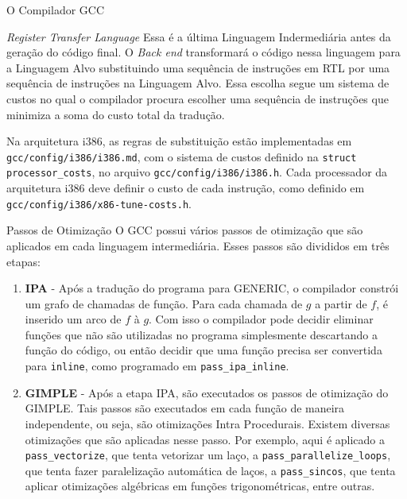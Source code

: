 \begin{section}{O Compilador GCC}
\begin{subsection}{\textit{Register Transfer Language}}
    Essa é a última Linguagem Indermediária antes da geração do código final. O
\textit{Back end} transformará o código nessa linguagem para a Linguagem Alvo
substituindo uma sequência de instruções em RTL por uma sequência de instruções
na Linguagem Alvo. Essa escolha segue um sistema
de custos no qual o compilador procura escolher uma sequência de instruções
que minimiza a soma do custo total da tradução.

    Na arquitetura i386, as regras de substituição estão implementadas
em \texttt{gcc/config/i386/i386.md}, com o sistema de custos definido
na \texttt{struct processor\_costs}, no arquivo \texttt{gcc/config/i386/i386.h}.
Cada processador da arquitetura i386 deve definir o custo de cada instrução,
como definido em \texttt{gcc/config/i386/x86-tune-costs.h}.


\end{subsection}

\begin{subsection}{Passos de Otimização}
    O GCC possui vários passos de otimização que são aplicados em cada linguagem
intermediária. Esses passos são divididos em três etapas:

    \begin{enumerate}
        \item \textbf{IPA} - Após a tradução do programa para GENERIC, o
            compilador constrói um grafo de chamadas de função. Para cada
            chamada de $g$ a partir de $f$, é inserido um arco de $f$ à $g$.
            Com isso o compilador pode decidir eliminar funções que não são
            utilizadas no programa simplesmente descartando a função do
            código, ou então decidir que uma função precisa ser convertida para
            \texttt{inline}, como programado em \texttt{pass\_ipa\_inline}.

        \item \textbf{GIMPLE} - Após a etapa IPA, são executados os passos
            de otimização do GIMPLE. Tais passos são executados em cada
            função de maneira independente, ou seja, são otimizações
            Intra Procedurais.
            Existem diversas otimizações que são aplicadas nesse passo.
            Por exemplo, aqui é aplicado a \texttt{pass\_vectorize},
            que tenta vetorizar um laço, a \texttt{pass\_parallelize\_loops},
            que tenta fazer paralelização automática de laços, a
            \texttt{pass\_sincos}, que tenta aplicar otimizações algébricas em
            funções trigonométricas, entre outras.


\end{enumerate}
\end{subsection}
\end{section}
